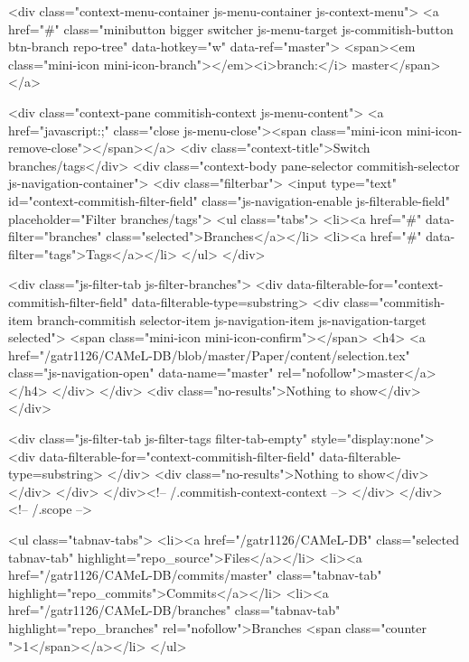     <div class="context-menu-container js-menu-container js-context-menu">
      <a href="#"
         class="minibutton bigger switcher js-menu-target js-commitish-button btn-branch repo-tree"
         data-hotkey="w"
         data-ref="master">
         <span><em class="mini-icon mini-icon-branch"></em><i>branch:</i> master</span>
      </a>

      <div class="context-pane commitish-context js-menu-content">
        <a href="javascript:;" class="close js-menu-close"><span class="mini-icon mini-icon-remove-close"></span></a>
        <div class="context-title">Switch branches/tags</div>
        <div class="context-body pane-selector commitish-selector js-navigation-container">
          <div class="filterbar">
            <input type="text" id="context-commitish-filter-field" class="js-navigation-enable js-filterable-field" placeholder="Filter branches/tags">
            <ul class="tabs">
              <li><a href="#" data-filter="branches" class="selected">Branches</a></li>
                <li><a href="#" data-filter="tags">Tags</a></li>
            </ul>
          </div>

          <div class="js-filter-tab js-filter-branches">
            <div data-filterable-for="context-commitish-filter-field" data-filterable-type=substring>
                <div class="commitish-item branch-commitish selector-item js-navigation-item js-navigation-target selected">
                  <span class="mini-icon mini-icon-confirm"></span>
                  <h4>
                      <a href="/gatr1126/CAMeL-DB/blob/master/Paper/content/selection.tex" class="js-navigation-open" data-name="master" rel="nofollow">master</a>
                  </h4>
                </div>
            </div>
            <div class="no-results">Nothing to show</div>
          </div>

            <div class="js-filter-tab js-filter-tags filter-tab-empty" style="display:none">
              <div data-filterable-for="context-commitish-filter-field" data-filterable-type=substring>
              </div>
              <div class="no-results">Nothing to show</div>
            </div>
        </div>
      </div><!-- /.commitish-context-context -->
    </div>
  </div> <!-- /.scope -->

  <ul class="tabnav-tabs">
    <li><a href="/gatr1126/CAMeL-DB" class="selected tabnav-tab" highlight="repo_source">Files</a></li>
    <li><a href="/gatr1126/CAMeL-DB/commits/master" class="tabnav-tab" highlight="repo_commits">Commits</a></li>
    <li><a href="/gatr1126/CAMeL-DB/branches" class="tabnav-tab" highlight="repo_branches" rel="nofollow">Branches <span class="counter ">1</span></a></li>
  </ul>

